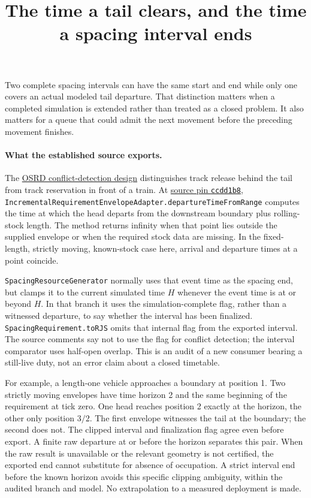 \documentclass{article}
\title{The time a tail clears, and the time a spacing interval ends}
\begin{document}
\maketitle

Two complete spacing intervals can have the same start and end while only one covers an actual modeled tail departure. That distinction matters when a completed simulation is extended rather than treated as a closed problem. It also matters for a queue that could admit the next movement before the preceding movement finishes.

\paragraph{What the established source exports.}
The \href{https://osrd.fr/en/docs/reference/design-docs/conflict-detection/}{OSRD conflict-detection design} distinguishes track release behind the tail from track reservation in front of a train. At \href{https://github.com/OpenRailAssociation/osrd/tree/ccdd1b8ed80982f0e2e8a818d231f9dceffa0861}{source pin \texttt{ccdd1b8}}, \texttt{IncrementalRequirementEnvelopeAdapter.departureTimeFromRange} computes the time at which the head departs from the downstream boundary plus rolling-stock length. The method returns infinity when that point lies outside the supplied envelope or when the required stock data are missing. In the fixed-length, strictly moving, known-stock case here, arrival and departure times at a point coincide.

\texttt{SpacingResourceGenerator} normally uses that event time as the spacing end, but clamps it to the current simulated time \(H\) whenever the event time is at or beyond \(H\). In that branch it uses the simulation-complete flag, rather than a witnessed departure, to say whether the interval has been finalized. \texttt{SpacingRequirement.toRJS} omits that internal flag from the exported interval. The source comments say not to use the flag for conflict detection; the interval comparator uses half-open overlap. This is an audit of a new consumer bearing a still-live duty, not an error claim about a closed timetable.

For example, a length-one vehicle approaches a boundary at position 1. Two strictly moving envelopes have time horizon 2 and the same beginning of the requirement at tick zero. One head reaches position 2 exactly at the horizon, the other only position \(3/2\). The first envelope witnesses the tail at the boundary; the second does not. The clipped interval and finalization flag agree even before export. A finite raw departure at or before the horizon separates this pair. When the raw result is unavailable or the relevant geometry is not certified, the exported end cannot substitute for absence of occupation. A strict interval end before the known horizon avoids this specific clipping ambiguity, within the audited branch and model. No extrapolation to a measured deployment is made.
\end{document}
